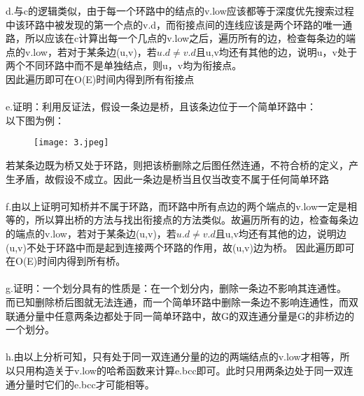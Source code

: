 \documentclass[19pt,a4paper]{article}
\begin{document}
\indent d.与c的逻辑类似，由于每一个环路中的结点的v.low应该都等于深度优先搜索过程中该环路中被发现的第一个点的v.d，而衔接点间的连线应该是两个环路的唯一通路，所以应该在c计算出每一个几点的v.low之后，遍历所有的边，检查每条边的端点的v.low，若对于某条边(u,v)，若$u.d\ne v.d$且u,v均还有其他的边，说明u，v处于两个不同环路中而不是单独结点，则u，v均为衔接点。\\
\indent 因此遍历即可在O(E)时间内得到所有衔接点\\
\\
\indent e.证明：利用反证法，假设一条边是桥，且该条边位于一个简单环路中：\\
以下图为例：
\begin{figure}[H]
\centering
\texttt{[image: 3.jpeg]}
\end{figure}
\indent 若某条边既为桥又处于环路，则把该桥删除之后图任然连通，不符合桥的定义，产生矛盾，故假设不成立。因此一条边是桥当且仅当改变不属于任何简单环路\\
\\
\indent f.由以上证明可知桥并不属于环路，而环路中所有点边的两个端点的v.low一定是相等的，所以算出桥的方法与找出衔接点的方法类似。故遍历所有的边，检查每条边的端点的v.low，若对于某条边(u,v)，若$u.d\ne v.d$且u,v均还有其他的边，说明边(u,v)不处于环路中而是起到连接两个环路的作用，故(u,v)边为桥。
\indent 因此遍历即可在O(E)时间内得到所有桥。\\
\\
\indent g.证明：一个划分具有的性质是：在一个划分内，删除一条边不影响其连通性。\\
而已知删除桥后图就无法连通，而一个简单环路中删除一条边不影响连通性，而双联通分量中任意两条边都处于同一简单环路中，故G的双连通分量是G的非桥边的一个划分。\\
\\
\indent h.由以上分析可知，只有处于同一双连通分量的边的两端结点的v.low才相等，所以只用构造关于v.low的哈希函数来计算e.bcc即可。此时只用两条边处于同一双连通分量时它们的e.bcc才可能相等。
\end{document}
